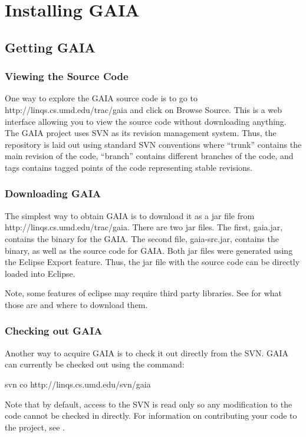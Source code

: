 
\chapter{Installing GAIA}
\section{Getting GAIA}
\subsection{Viewing the Source Code}
One way to explore the GAIA source code is to go to
http://linqs.cs.umd.edu/trac/gaia and click on Browse Source.
This is a web interface allowing you to view the source code without
downloading anything.  The GAIA project uses SVN as its
revision management system.  Thus, the repository is laid
out using standard SVN conventions where ``trunk'' contains
the main revision of the code, ``branch'' contains different branches of the code,
and tags contains tagged points of the code representing stable revisions.

\subsection{Downloading GAIA}
The simplest way to obtain GAIA is to download it as a jar file
from http://linqs.cs.umd.edu/trac/gaia.  There are two jar files.
The first, gaia.jar, contains the binary for the GAIA.
The second file, gaia-src.jar, contains the binary, as
well as the source code for GAIA.  Both jar files were generated
using the Eclipse Export feature.  Thus, the jar file with the
source code can be directly loaded into Eclipse.

Note, some features of eclipse may require third party libraries.
See  for what those are and where to download them.

\subsection{Checking out GAIA}
Another way to acquire GAIA is to check it out directly from the SVN.
GAIA can currently be checked out using the command:

svn co http://linqs.cs.umd.edu/svn/gaia

Note that by default, access to the SVN is read only so any modification
to the code cannot be checked in directly.  For information
on contributing your code to the project, see .

